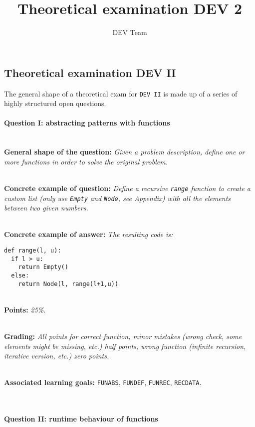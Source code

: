 \documentclass[10pt,a4paper]{article}
\author{DEV Team}
\title{Theoretical examination DEV 2}
\begin{document}
\subsection{Theoretical examination DEV II}
The general shape of a theoretical exam for \texttt{DEV II} is made up of a series of highly structured open questions.


\paragraph{Question I: abstracting patterns with functions} \ \\

\textbf{General shape of the question:} \textit{Given a problem description, define one or more functions in order to solve the original problem.}

\ \\ 

\textbf{Concrete example of question:} \textit{Define a recursive \texttt{range} function to create a custom list (only use \texttt{Empty} and \texttt{Node}, see Appendix) with all the elements between two given numbers.}

\ \\ 

\textbf{Concrete example of answer:} \textit{The resulting code is:}

\begin{lstlisting}
def range(l, u):
  if l > u:
    return Empty()
  else:
    return Node(l, range(l+1,u))
\end{lstlisting}

\ \\ 

\textbf{Points:} \textit{25\%.}

\ \\ 

\textbf{Grading:} \textit{All points for correct function, minor mistakes (wrong check, some elements might be missing, etc.) half points, wrong function (infinite recursion, iterative version, etc.) zero points.}

\ \\ 

\textbf{Associated learning goals:} \texttt{FUNABS}, \texttt{FUNDEF}, \texttt{FUNREC}, \texttt{RECDATA}.

\ \\ 

\paragraph{Question II: runtime behaviour of functions} \ \\
\end{document}
